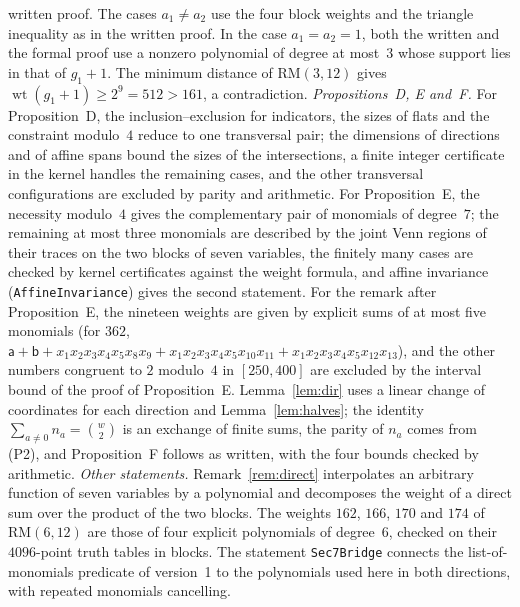 \documentclass[11pt]{article}
\theoremstyle{remark}
\newcommand{\RM}{\mathrm{RM}}
\DeclareMathOperator{\wt}{wt}
\newcommand{\sa}{\mathsf a}
\newcommand{\sbb}{\mathsf b}
\begin{document}
written proof. The cases $a_1\ne a_2$ use the four block weights and the
triangle inequality as in the written proof. In the case $a_1=a_2=1$, both the
written and the formal proof use a nonzero polynomial of degree at most~$3$
whose support lies in that of $g_1+1$. The minimum distance of $\RM(3,12)$
gives $\wt(g_1+1)\ge2^9=512>161$, a contradiction.
\emph{Propositions~D, E and~F.} For Proposition~D, the inclusion--exclusion
for indicators, the sizes of flats and the constraint modulo~$4$ reduce to
one transversal pair; the dimensions of directions and of affine spans bound
the sizes of the intersections, a finite integer certificate in the kernel
handles the remaining cases, and the other transversal configurations are
excluded by parity and arithmetic. For Proposition~E, the necessity modulo~$4$ gives the
complementary pair of monomials of degree~$7$; the remaining at most three
monomials are described by the joint Venn regions of their traces on the two
blocks of seven variables, the finitely many cases are checked by kernel
certificates against the weight formula, and affine invariance
(\texttt{AffineInvariance}) gives the second statement. For the remark after
Proposition~E, the nineteen weights are given by explicit sums of at most five
monomials (for $362$,
$\sa+\sbb+x_1x_2x_3x_4x_5x_8x_9+x_1x_2x_3x_4x_5x_{10}x_{11}+x_1x_2x_3x_4x_5x_{12}x_{13}$),
and the other numbers congruent to $2$ modulo~$4$ in $[250,400]$ are excluded
by the interval bound of the proof of Proposition~E.
Lemma~\ref{lem:dir} uses a linear change of coordinates for each direction and
Lemma~\ref{lem:halves}; the identity $\sum_{a\ne0}n_a=\binom w2$ is an
exchange of finite sums, the parity of $n_a$ comes from (P2), and
Proposition~F follows as written, with the four bounds checked by arithmetic.
\emph{Other statements.} Remark~\ref{rem:direct} interpolates an arbitrary
function of seven variables by a polynomial and decomposes the weight of a
direct sum over the product of the two blocks. The weights $162$, $166$, $170$
and $174$ of $\RM(6,12)$ are those of four explicit polynomials of degree~$6$,
checked on their $4096$-point truth tables in blocks. The statement
\texttt{Sec7Bridge} connects the list-of-monomials predicate of version~1 to
the polynomials used here in both directions, with repeated monomials
cancelling.
\end{document}
